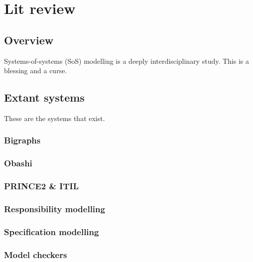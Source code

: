 \chapter{Lit review}

\section{Overview}

Systems-of-systems (SoS) modelling is a deeply interdisciplinary study. This is a blessing and a curse.
\par


\section{Extant systems}
These are the systems that exist.


\subsection{Bigraphs}


\subsection{Obashi}



\subsection{PRINCE2 \& ITIL}



\subsection{Responsibility modelling}


\subsection{Specification modelling}


\subsection{Model checkers}



